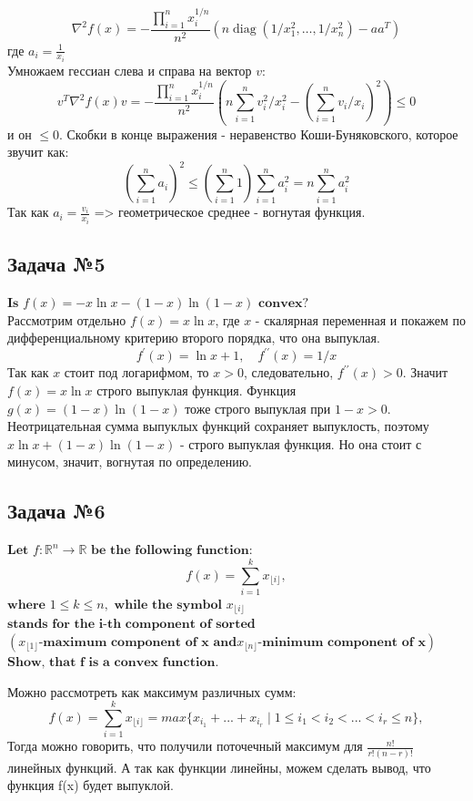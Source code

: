 \documentclass[12pt,letterpaper]{article}
\begin{document}
$$ \nabla^{2} f(x)=-\frac{\prod_{i=1}^{n} x_{i}^{1 / n}}{n^{2}}\left(n \operatorname{diag}\left(1 / x_{1}^{2}, \ldots, 1 / x_{n}^{2}\right)-a a^{T}\right) $$
где $ a_i = \frac{1}{x_i} $\\
Умножаем гессиан слева и справа на вектор $ v $:
$$ v^{T} \nabla^{2} f(x) v=-\frac{\prod_{i=1}^{n} x_{i}^{1 / n}}{n^{2}}\left(n \sum_{i=1}^{n} v_{i}^{2} / x_{i}^{2}-\left(\sum_{i=1}^{n} v_{i} / x_{i}\right)^{2}\right) \leq 0 $$
и он $ \leq 0 $. Скобки в конце выражения - неравенство Коши-Буняковского, которое звучит как: 
$$ \left(\sum_{i=1}^{n} a_{i}\right)^{2} \leq\left(\sum_{i=1}^{n} 1\right) \sum_{i=1}^{n} a_{i}^{2}=n \sum_{i=1}^{n} a_{i}^{2} $$
Так как $ a_i = \frac{v_i}{x_i}$ => геометрическое среднее - вогнутая функция.

\subsection*{Задача №5}
$\textbf{Is}$ $f(x) = -x \ln x - (1-x) \ln (1-x)$ $\textbf{convex?}$\\

Рассмотрим отдельно $ f(x) = x \ln x $, где $ x $ - скалярная переменная и покажем по дифференциальному критерию второго порядка, что она выпуклая. 
$$ f^{\prime}(x)=\ln x+1, \quad f^{\prime \prime}(x)=1 / x $$
Так как $ x $ стоит под логарифмом, то $ x > 0 $, следовательно, $ f^{\prime \prime}(x) > 0 $. Значит $ f(x) = x \ln x $ строго выпуклая функция. Функция $ g(x) = (1 - x) \ln (1 - x) $ тоже строго выпуклая при $ 1 - x > 0 $.\\
Неотрицательная сумма выпуклых функций сохраняет выпуклость, поэтому\\ $ x \ln x + (1 - x) \ln (1 - x) $ - строго выпуклая функция. Но она стоит с минусом, значит, вогнутая по определению.

\subsection*{Задача №6}
$\textbf{Let}$ $f: \mathbb{R}^n\rightarrow\mathbb{R}$ $\textbf{be the following function:}$
$$f(x)=\sum^k_{i=1}x_{\lfloor i\rfloor},$$
$\textbf{where}$ $1\leqslant k\leqslant n,$ $\textbf{while the symbol}$ $x_{\lfloor i\rfloor}$ $\textbf{stands for the i-th component of sorted}$ $(x_{\lfloor1\rfloor}\textbf{-maximum component of x and} x_{\lfloor n \rfloor}\textbf{-minimum component of x})$ \\ $\textbf{Show, that f is a convex function.}$ 

Можно рассмотреть как максимум различных сумм:
$$ f(x)=\sum^k_{i=1}x_{\lfloor i\rfloor} = max\{x_{i_1}+...+x_{i_r}\mid 1\leq i_1<i_2<...<i_r\leq n\},$$
Тогда можно говорить, что получили поточечный максимум для $\frac{n!}{r!(n-r)!}$ линейных функций. А так как функции линейны, можем сделать вывод, что функция f(x) будет выпуклой.
\end{document}

